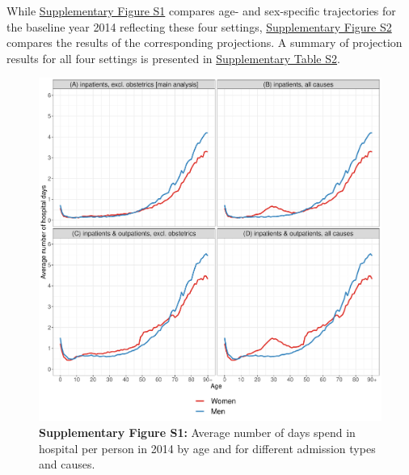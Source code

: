 \label{ch5:textS1}

While \hyperref[ch5:figS1]{Supplementary Figure S1} compares age- and sex-specific 
trajectories for the baseline year 2014 reflecting these four settings, 
\hyperref[ch5:figS2]{Supplementary Figure S2} compares the results of the 
corresponding projections. A summary of projection results for all four settings 
is presented in \hyperref[ch5:tabS2]{Supplementary Table S2}.\\






\newpage


	\begin{figure}[H]
		\centering
		\includegraphics[scale=0.45]{Paper_4/Supplementary_Figure_S1.pdf}
		\caption*{	\textbf{Supplementary Figure S1:} Average number of days spend 
					in hospital per person in 2014 by age and for different 
					admission types and causes.}
	\label{ch5:figS1}
	\end{figure}
	



